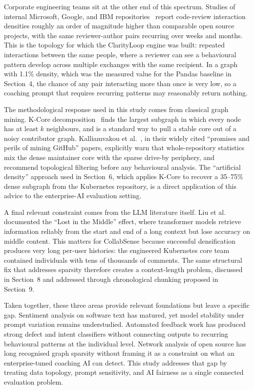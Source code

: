 \documentclass[a4paper,UKenglish,cleveref,autoref]{lipics-v2021}
\begin{document}
Corporate engineering teams sit at the other end of this spectrum. Studies of internal Microsoft, Google, and IBM repositories~\cite{bird2011dont,sadowski2018modern} report code-review interaction densities roughly an order of magnitude higher than comparable open source projects, with the same reviewer-author pairs recurring over weeks and months. This is the topology for which the ClarityLoop engine was built: repeated interactions between the same people, where a reviewer can see a behavioural pattern develop across multiple exchanges with the same recipient. In a graph with 1.1\% density, which was the measured value for the Pandas baseline in Section~4, the chance of any pair interacting more than once is very low, so a coaching prompt that requires recurring patterns may reasonably return nothing.

The methodological response used in this study comes from classical graph mining. K-Core decomposition~\cite{seidman1983network,batagelj2011fast} finds the largest subgraph in which every node has at least $k$ neighbours, and is a standard way to pull a stable core out of a noisy contributor graph. Kalliamvakou et al.~\cite{kalliamvakou2014promises,kalliamvakou2016indepth}, in their widely cited ``promises and perils of mining GitHub'' papers, explicitly warn that whole-repository statistics mix the dense maintainer core with the sparse drive-by periphery, and recommend topological filtering before any behavioural analysis. The ``artificial density'' approach used in Section~6, which applies K-Core to recover a 35--75\% dense subgraph from the Kubernetes repository, is a direct application of this advice to the enterprise-AI evaluation setting.

A final relevant constraint comes from the LLM literature itself. Liu et al.~\cite{liu2024lost} documented the ``Lost in the Middle'' effect, where transformer models retrieve information reliably from the start and end of a long context but lose accuracy on middle content. This matters for CollabSense because successful densification produces very long per-user histories: the engineered Kubernetes core team contained individuals with tens of thousands of comments. The same structural fix that addresses sparsity therefore creates a context-length problem, discussed in Section~8 and addressed through chronological chunking proposed in Section~9.

Taken together, these three areas provide relevant foundations but leave a specific gap. Sentiment analysis on software text has matured, yet model stability under prompt variation remains understudied. Automated feedback work has produced strong defect and intent classifiers without connecting outputs to recurring behavioural patterns at the individual level. Network analysis of open source has long recognised graph sparsity without framing it as a constraint on what an enterprise-tuned coaching AI can detect. This study addresses that gap by treating data topology, prompt sensitivity, and AI fairness as a single connected evaluation problem.
\end{document}
